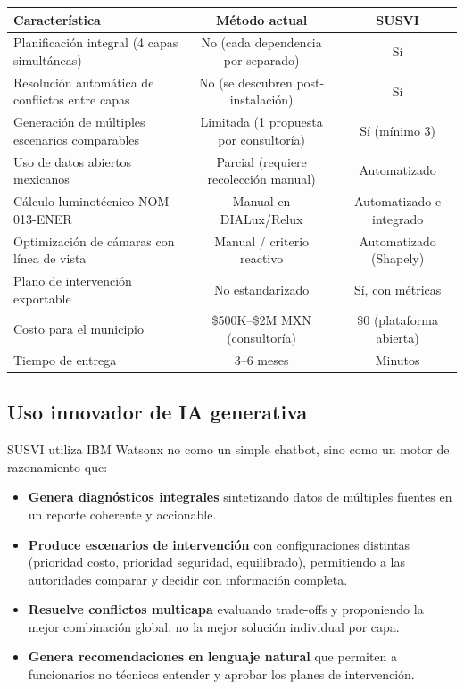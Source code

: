 \documentclass[12pt,a4paper]{article}
\begin{document}
\begin{table}[H]
\centering
\small
\begin{tabularx}{\textwidth}{X c c}
\toprule
\textbf{Característica} & \textbf{Método actual} & \textbf{SUSVI} \\
\midrule
Planificación integral (4 capas simultáneas) & No (cada dependencia por separado) & Sí \\
Resolución automática de conflictos entre capas & No (se descubren post-instalación) & Sí \\
Generación de múltiples escenarios comparables & Limitada (1 propuesta por consultoría) & Sí (mínimo 3) \\
Uso de datos abiertos mexicanos & Parcial (requiere recolección manual) & Automatizado \\
Cálculo luminotécnico NOM-013-ENER & Manual en DIALux/Relux & Automatizado e integrado \\
Optimización de cámaras con línea de vista & Manual / criterio reactivo & Automatizado (Shapely) \\
Plano de intervención exportable & No estandarizado & Sí, con métricas \\
Costo para el municipio & \$500K--\$2M MXN (consultoría) & \$0 (plataforma abierta) \\
Tiempo de entrega & 3--6 meses & Minutos \\
\bottomrule
\end{tabularx}
\end{table}

\subsection{Uso innovador de IA generativa}

SUSVI utiliza IBM Watsonx no como un simple chatbot, sino como un motor de razonamiento que:

\begin{itemize}[leftmargin=1.5cm]
    \item \textbf{Genera diagnósticos integrales} sintetizando datos de múltiples fuentes en un reporte coherente y accionable.
    \item \textbf{Produce escenarios de intervención} con configuraciones distintas (prioridad costo, prioridad seguridad, equilibrado), permitiendo a las autoridades comparar y decidir con información completa.
    \item \textbf{Resuelve conflictos multicapa} evaluando trade-offs y proponiendo la mejor combinación global, no la mejor solución individual por capa.
    \item \textbf{Genera recomendaciones en lenguaje natural} que permiten a funcionarios no técnicos entender y aprobar los planes de intervención.
\end{itemize}
\end{document}

